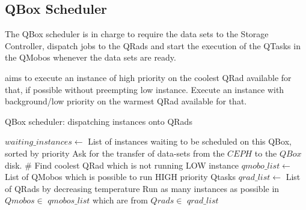 \subsection{QBox Scheduler}

The QBox scheduler is in charge to require the data sets to the Storage Controller, dispatch jobs to the QRads and start the execution of the QTasks in the QMobos whenever the data sets are ready.

 aims to execute an instance of high priority on the coolest QRad available for that, if possible without preempting low instance.
Execute an instance with background/low priority on the warmest QRad available for that.

\begin{algorithm}[H]
    \caption{QBox scheduler: dispatching instances onto QRads}
    \label{alg:BoxSched}
        \begin{algorithmic}[1]

\begin{comment}

        \STATE $waiting\_instances \leftarrow$ List of instances waiting to be scheduled on this QBox, sorted by priority
        \FOR{$qtask \in$ $waiting\_instances$}
            \STATE Ask for the transfer of data-sets from the $CEPH$ to the $QBox$ disk. 
            \STATE Make reservations for as much instances as possible of the $qtask$ on $Qmobos$
            
            \STATE Reject the instances that did not get a reservation
            
            \STATE $Upon$ data-sets are all on disk, start the instances on the reserved $Qmobos$
        \ENDFOR 
\end{comment}       

        \STATE $waiting\_instances \leftarrow$ List of instances waiting to be scheduled on this QBox, sorted by priority
            \STATE Ask for the transfer of data-sets from the $CEPH$ to the $QBox$ disk. 
                    \STATE \# Find coolest QRad which is not running LOW instance
                    \STATE $qmobo\_list \leftarrow$ List of QMobos which is possible to run HIGH priority Qtasks
                    \STATE $qrad\_list \leftarrow$ List of QRads by decreasing temperature
                    \STATE Run as many instances as possible in $Qmobos \in$ $qmobos\_list$ which are from $Qrads \in$ $qrad\_list$


\end{algorithmic}
\end{algorithm}
